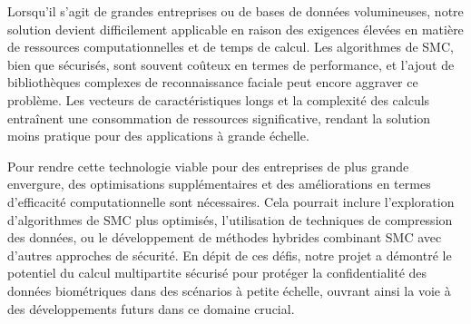 \documentclass[12pt,a4paper]{article}
\begin{document}
Lorsqu'il s'agit de grandes entreprises ou de bases de données volumineuses, notre solution devient difficilement applicable en raison des exigences élevées en matière de ressources computationnelles et de temps de calcul. Les algorithmes de SMC, bien que sécurisés, sont souvent coûteux en termes de performance, et l'ajout de bibliothèques complexes de reconnaissance faciale peut encore aggraver ce problème. Les vecteurs de caractéristiques longs et la complexité des calculs entraînent une consommation de ressources significative, rendant la solution moins pratique pour des applications à grande échelle.

Pour rendre cette technologie viable pour des entreprises de plus grande envergure, des optimisations supplémentaires et des améliorations en termes d'efficacité computationnelle sont nécessaires. Cela pourrait inclure l'exploration d'algorithmes de SMC plus optimisés, l'utilisation de techniques de compression des données, ou le développement de méthodes hybrides combinant SMC avec d'autres approches de sécurité. En dépit de ces défis, notre projet a démontré le potentiel du calcul multipartite sécurisé pour protéger la confidentialité des données biométriques dans des scénarios à petite échelle, ouvrant ainsi la voie à des développements futurs dans ce domaine crucial.

\newpage
\printbibliography
\end{document}

